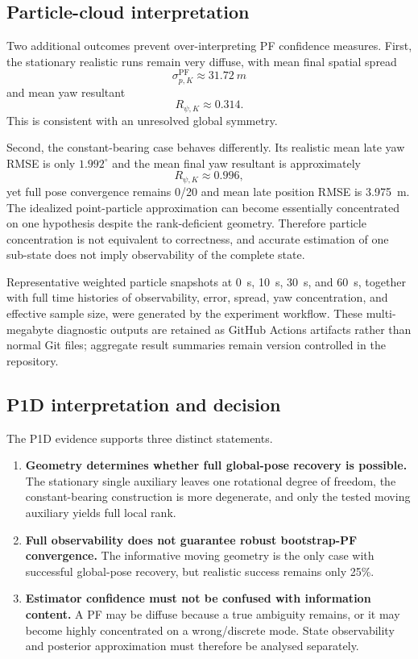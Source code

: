 \subsection{Particle-cloud interpretation}
Two additional outcomes prevent over-interpreting PF confidence measures. First, the stationary realistic runs remain very diffuse, with mean final spatial spread
\begin{equation}
    \sigma_{p,K}^{\mathrm{PF}}\approx\SI{31.72}{m}
\end{equation}
and mean yaw resultant
\begin{equation}
    R_{\psi,K}\approx0.314.
\end{equation}
This is consistent with an unresolved global symmetry.

Second, the constant-bearing case behaves differently. Its realistic mean late yaw RMSE is only $1.992^{\circ}$ and the mean final yaw resultant is approximately
\begin{equation}
    R_{\psi,K}\approx0.996,
\end{equation}
yet full pose convergence remains 0/20 and mean late position RMSE is \SI{3.975}{m}. The idealized point-particle approximation can become essentially concentrated on one hypothesis despite the rank-deficient geometry. Therefore particle concentration is not equivalent to correctness, and accurate estimation of one sub-state does not imply observability of the complete state.

Representative weighted particle snapshots at \SI{0}{s}, \SI{10}{s}, \SI{30}{s}, and \SI{60}{s}, together with full time histories of observability, error, spread, yaw concentration, and effective sample size, were generated by the experiment workflow. These multi-megabyte diagnostic outputs are retained as GitHub Actions artifacts rather than normal Git files; aggregate result summaries remain version controlled in the repository.

\subsection{P1D interpretation and decision}
The P1D evidence supports three distinct statements.

\begin{enumerate}
    \item \textbf{Geometry determines whether full global-pose recovery is possible.} The stationary single auxiliary leaves one rotational degree of freedom, the constant-bearing construction is more degenerate, and only the tested moving auxiliary yields full local rank.
    \item \textbf{Full observability does not guarantee robust bootstrap-PF convergence.} The informative moving geometry is the only case with successful global-pose recovery, but realistic success remains only 25\%.
    \item \textbf{Estimator confidence must not be confused with information content.} A PF may be diffuse because a true ambiguity remains, or it may become highly concentrated on a wrong/discrete mode. State observability and posterior approximation must therefore be analysed separately.
\end{enumerate}

